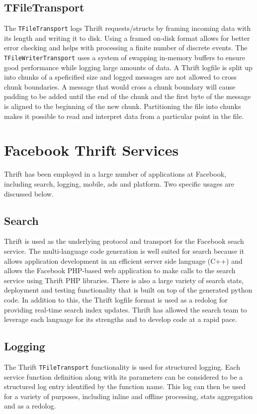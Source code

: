 \documentclass[nocopyrightspace,blockstyle]{sigplanconf}
\begin{document}
\subsection{TFileTransport}
The \texttt{TFileTransport} logs Thrift requests/structs by 
framing incoming data with its length and writing it to disk. 
Using a framed on-disk format allows for better error checking and 
helps with processing a finite number of discrete events. The\\
\texttt{TFileWriterTransport} uses a system of swapping in-memory buffers 
to ensure good performance while logging large amounts of data. 
A Thrift logfile is split up into chunks of a speficified size and logged messages
are not allowed to cross chunk boundaries. A message that would cross a chunk 
boundary will cause padding to be added until the end of the chunk and the 
first byte of the message is aligned to the beginning of the new chunk.
Partitioning the file into chunks makes it possible to read and interpret data 
from a particular point in the file. 

\section{Facebook Thrift Services}
Thrift has been employed in a large number of applications at Facebook, including
search, logging, mobile, ads and platform. Two specific usages are discussed below.

\subsection{Search}
Thrift is used as the underlying protocol and transport for the Facebook seach service.
The multi-language code generation is well suited for search because it allows application
development in an efficient server side language (C++) and allows the Facebook PHP-based web application
to make calls to the search service using Thrift PHP libraries. There is also a large
variety of search stats, deployment and testing functionality that is built on top 
of the generated python code. In addition to this, the Thrift logfile format is
used as a redolog for providing real-time search index updates. Thrift has allowed the 
search team to leverage each language for its strengths and to develop code at a rapid pace. 

\subsection{Logging}
The Thrift \texttt{TFileTransport} functionality is used for structured logging. Each
service function definition along with its parameters can be considered to be
a structured log entry identified by the function name. This log can then be used for 
a variety of purposes, including inline and offline processing, stats aggregation and as a redolog.
\end{document}
